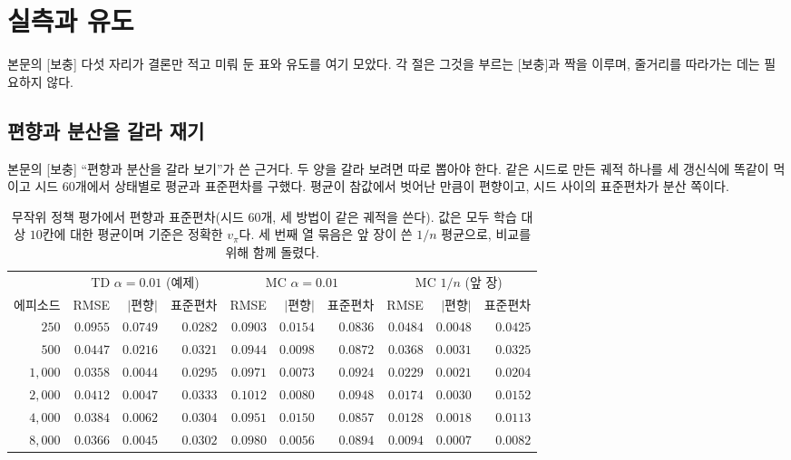\documentclass[11pt,a4paper]{article}
\begin{document}
\section{실측과 유도}
\label{app:main}

본문의 [보충] 다섯 자리가 결론만 적고 미뤄 둔 표와 유도를 여기 모았다. 각 절은 그것을 부르는
[보충]과 짝을 이루며, 줄거리를 따라가는 데는 필요하지 않다.

\subsection{편향과 분산을 갈라 재기}
\label{app:bias-var}

본문의 [보충] ``편향과 분산을 갈라 보기''가 쓴 근거다. 두 양을 갈라 보려면 따로 뽑아야 한다. 같은
시드로 만든 궤적 하나를 세 갱신식에 똑같이 먹이고 시드 $60$개에서 상태별로 평균과 표준편차를
구했다. 평균이 참값에서 벗어난 만큼이 편향이고, 시드 사이의 표준편차가 분산 쪽이다.

\begin{table}[htbp]
\centering
\caption{무작위 정책 평가에서 편향과 표준편차(시드 $60$개, 세 방법이 같은 궤적을 쓴다). 값은 모두
학습 대상 $10$칸에 대한 평균이며 기준은 정확한 $v_\pi$다. 세 번째 열 묶음은 앞 장이 쓴 $1/n$
평균으로, 비교를 위해 함께 돌렸다.}
\label{tab:bias-var}
\small
\begin{tabular}{@{}rrrrrrrrrr@{}}
\toprule
& \multicolumn{3}{c}{TD $\alpha=0.01$ (예제)} & \multicolumn{3}{c}{MC $\alpha=0.01$}
& \multicolumn{3}{c}{MC $1/n$ (앞 장)} \\
\cmidrule(lr){2-4}\cmidrule(lr){5-7}\cmidrule(lr){8-10}
에피소드 & RMSE & $|$편향$|$ & 표준편차 & RMSE & $|$편향$|$ & 표준편차 & RMSE & $|$편향$|$ & 표준편차 \\
\midrule
$250$    & $0.0955$ & $0.0749$ & $0.0282$ & $0.0903$ & $0.0154$ & $0.0836$ & $0.0484$ & $0.0048$ & $0.0425$ \\
$500$    & $0.0447$ & $0.0216$ & $0.0321$ & $0.0944$ & $0.0098$ & $0.0872$ & $0.0368$ & $0.0031$ & $0.0325$ \\
$1{,}000$& $0.0358$ & $0.0044$ & $0.0295$ & $0.0971$ & $0.0073$ & $0.0924$ & $0.0229$ & $0.0021$ & $0.0204$ \\
$2{,}000$& $0.0412$ & $0.0047$ & $0.0333$ & $0.1012$ & $0.0080$ & $0.0948$ & $0.0174$ & $0.0030$ & $0.0152$ \\
$4{,}000$& $0.0384$ & $0.0062$ & $0.0304$ & $0.0951$ & $0.0150$ & $0.0857$ & $0.0128$ & $0.0018$ & $0.0113$ \\
$8{,}000$& $0.0366$ & $0.0045$ & $0.0302$ & $0.0980$ & $0.0056$ & $0.0894$ & $0.0094$ & $0.0007$ & $0.0082$ \\
\bottomrule
\end{tabular}
\end{table}
\end{document}
